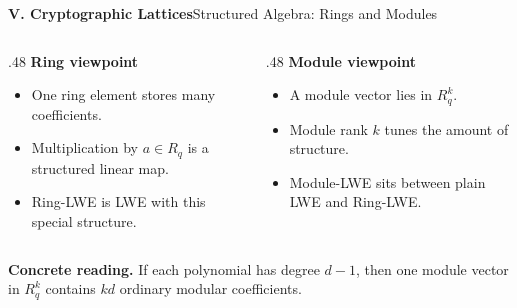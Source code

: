 \begin{frame}[shrink=8]{\textbf{V. Cryptographic Lattices}}{Structured Algebra: Rings and Modules}
\begin{columns}[T,onlytextwidth]
\begin{column}{.48\textwidth}
\textcolor{TealDarkCyan}{\textbf{Ring viewpoint}}
\begin{itemize}
  \item One ring element stores many coefficients.
  \item Multiplication by $a\in R_q$ is a structured linear map.
  \item Ring-LWE is LWE with this special structure.
\end{itemize}
\end{column}
\begin{column}{.48\textwidth}
\textcolor{TealDarkCyan}{\textbf{Module viewpoint}}
\begin{itemize}
  \item A module vector lies in $R_q^k$.
  \item Module rank $k$ tunes the amount of structure.
  \item Module-LWE sits between plain LWE and Ring-LWE.
\end{itemize}
\end{column}
\end{columns}
\textbf{Concrete reading.}\; If each polynomial has degree $d-1$, then one module vector in $R_q^k$ contains $kd$ ordinary modular coefficients.
\end{frame}

